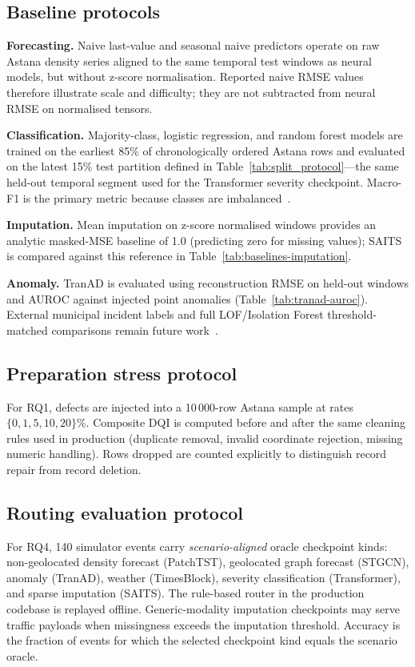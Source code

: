 \subsection{Baseline protocols}

\textbf{Forecasting.} Naive last-value and seasonal naive predictors operate on raw Astana density series aligned to the same temporal test windows as neural models, but without z-score normalisation. Reported naive RMSE values therefore illustrate scale and difficulty; they are not subtracted from neural RMSE on normalised tensors.

\textbf{Classification.} Majority-class, logistic regression, and random forest models are trained on the earliest 85\% of chronologically ordered Astana rows and evaluated on the latest 15\% test partition defined in Table~\ref{tab:split_protocol}---the same held-out temporal segment used for the Transformer severity checkpoint. Macro-F1 is the primary metric because classes are imbalanced~\cite{breiman2001random}.

\textbf{Imputation.} Mean imputation on z-score normalised windows provides an analytic masked-MSE baseline of 1.0 (predicting zero for missing values); SAITS is compared against this reference in Table~\ref{tab:baselines-imputation}.

\textbf{Anomaly.} TranAD is evaluated using reconstruction RMSE on held-out windows and AUROC against injected point anomalies (Table~\ref{tab:tranad-auroc}). External municipal incident labels and full LOF/Isolation Forest threshold-matched comparisons remain future work~\cite{breunig2000lof,liu2008isolation,pang2021deep}.

\subsection{Preparation stress protocol}

For RQ1, defects are injected into a 10\,000-row Astana sample at rates $\{0,1,5,10,20\}\%$. Composite DQI is computed before and after the same cleaning rules used in production (duplicate removal, invalid coordinate rejection, missing numeric handling). Rows dropped are counted explicitly to distinguish record repair from record deletion.

\subsection{Routing evaluation protocol}

For RQ4, 140 simulator events carry \emph{scenario-aligned} oracle checkpoint kinds: non-geolocated density forecast (PatchTST), geolocated graph forecast (STGCN), anomaly (TranAD), weather (TimesBlock), severity classification (Transformer), and sparse imputation (SAITS). The rule-based router in the production codebase is replayed offline. Generic-modality imputation checkpoints may serve traffic payloads when missingness exceeds the imputation threshold. Accuracy is the fraction of events for which the selected checkpoint kind equals the scenario oracle.

